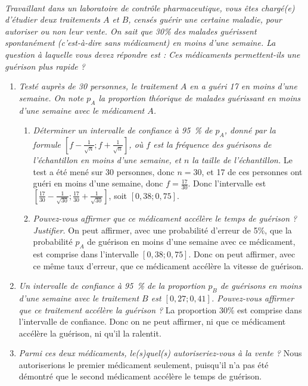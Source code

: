 \documentclass[12pt]{article}
\begin{document}
\begin{exercice}~

  \emph{Travaillant dans un laboratoire de contrôle pharmaceutique, vous êtes chargé(e) d'étudier deux traitements $A$ et $B$, censés guérir une certaine maladie, pour autoriser ou non leur vente. On sait que 30\% des malades guérissent spontanément (c'est-à-dire sans médicament) en moins d'une semaine. La question à laquelle vous devez répondre est : Ces médicaments permettent-ils une guérison plus rapide ?}

  \begin{enumerate}
    \item \emph{Testé auprès de 30 personnes, le traitement $A$ en a guéri 17 en moins d'une semaine. On note $p_A$ la proportion théorique de malades guérissant en moins d'une semaine avec le médicament $A$.}
    \begin{enumerate}
      \item \emph{Déterminer un intervalle de confiance à 95~\% de $p_A$, donné par la formule $\left[f-\frac{1}{\sqrt{n}};f+\frac{1}{\sqrt{n}}\right]$, où $f$ est la fréquence des guérisons de l'échantillon en moins d'une semaine, et $n$ la taille de l'échantillon.} Le test a été mené sur 30 personnes, donc $n=30$, et 17 de ces personnes ont guéri en moins d'une semaine, donc $f=\frac{17}{30}$. Donc l'intervalle est $\left[\frac{17}{30}-\frac{1}{\sqrt{30}};\frac{17}{30}+\frac{1}{\sqrt{30}}\right]$, soit $[0,38;0,75]$.
      \item \emph{Pouvez-vous affirmer que ce médicament accélère le temps de guérison ? Justifier.} On peut affirmer, avec une probabilité d'erreur de 5\%, que la probabilité $p_A$ de guérison en moins d'une semaine avec ce médicament, est comprise dans l'intervalle $[0,38;0,75]$. Donc on peut affirmer, avec ce même taux d'erreur, que ce médicament accélère la vitesse de guérison.
    \end{enumerate}
    \item \emph{Un intervalle de confiance à 95~\% de la proportion $p_B$ de guérisons en moins d'une semaine avec le traitement $B$ est $\left[0,27;0,41\right]$. Pouvez-vous affirmer que ce traitement accélère la guérison ?} La proportion 30\% est comprise dans l'intervalle de confiance. Donc on ne peut affirmer, ni que ce médicament accélère la guérison, ni qu'il la ralentit.
    \item \emph{Parmi ces deux médicaments, le(s)quel(s) autoriseriez-vous à la vente ?} Nous autoriserions le premier médicament seulement, puisqu'il n'a pas été démontré que le second médicament accélère le temps de guérison.
  \end{enumerate}
\end{exercice}
\end{document}
